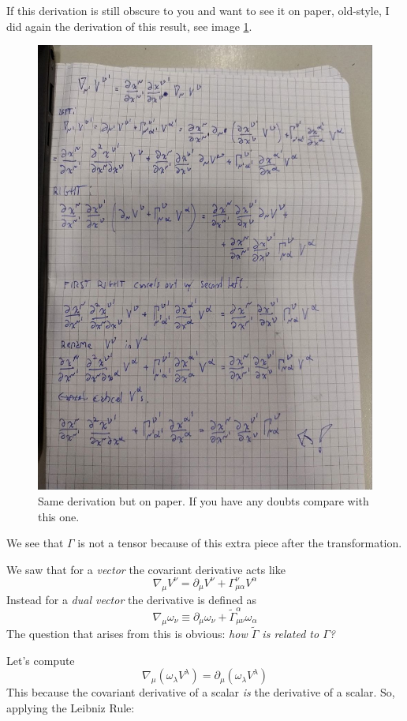 If this derivation is still obscure to you and want to see it on paper, old-style, I did again the derivation of this result, see image \ref{imm:conntransf}.
\begin{figure}[h]
\centering
\includegraphics[width=0.8\linewidth]{imm/conntransf.jpg}
\caption{Same derivation but on paper. If you have any doubts compare with this one.}
\label{imm:conntransf}
\end{figure}
We see that $\Gamma $ is not a tensor because of this extra piece after the transformation.\par
We saw that for a \emph{vector} the covariant derivative acts like
\[
\nabla_{\mu }V^{\nu } = \partial_{\mu }V^{\nu } + \Gamma ^{\nu }_{\mu \alpha }V^{\alpha }
\]
Instead for a \emph{dual vector} the derivative is defined as
\[
\nabla _{\mu} \omega _{\nu } \equiv \partial_{\mu }\omega _{\nu } + \tilde{\Gamma }^{\alpha }_{\mu \nu }\omega _{\alpha }
\]
The question that arises from this is obvious: \emph{how $\tilde{\Gamma }$ is related to $\Gamma $?}\par
Let's compute 
\[
\nabla _{\mu }\left( \omega _{\lambda }V^{\lambda } \right) = \partial_{\mu } \left( \omega _{\lambda }V^{\lambda } \right)
\]
This because the covariant derivative of a scalar \emph{is} the derivative of a scalar. So, applying the Leibniz Rule:
